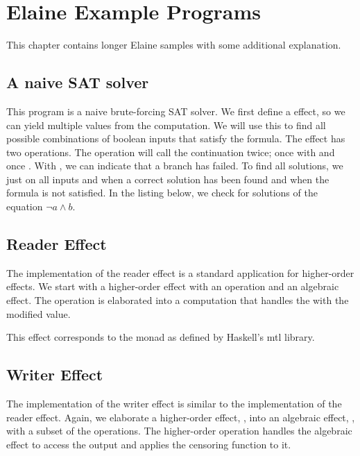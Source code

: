 \chapter{Elaine Example Programs}\label{chap:examples}

This chapter contains longer Elaine samples with some additional explanation.

\section{A naive SAT solver}\label{sec:sat}

This program is a naive brute-forcing SAT solver. We first define a  effect, so we can yield multiple values from the computation. We will use this to find all possible combinations of boolean inputs that satisfy the formula. The  effect has two operations. The  operation will call the continuation twice; once with  and once . With , we can indicate that a branch has failed. To find all solutions, we just  on all inputs and  when a correct solution has been found and  when the formula is not satisfied. In the listing below, we check for solutions of the equation $\neg a \wedge b$.


\section{Reader Effect}\label{sec:reader}

The implementation of the reader effect is a standard application for higher-order effects. We start with a higher-order  effect with an operation  and an algebraic  effect. The  operation is elaborated into a computation that handles the  with the modified value.

This effect corresponds to the  monad as defined by Haskell's mtl library.


\section{Writer Effect}\label{sec:writer}

The implementation of the writer effect is similar to the implementation of the reader effect. Again, we elaborate a higher-order effect, , into an algebraic effect, , with a subset of the operations. The higher-order  operation handles the algebraic effect to access the output and applies the censoring function to it.

